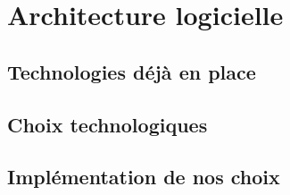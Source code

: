 \chapter{Architecture logicielle}

\section{Technologies déjà en place}

\section{Choix technologiques}

\section{Implémentation de nos choix}

   